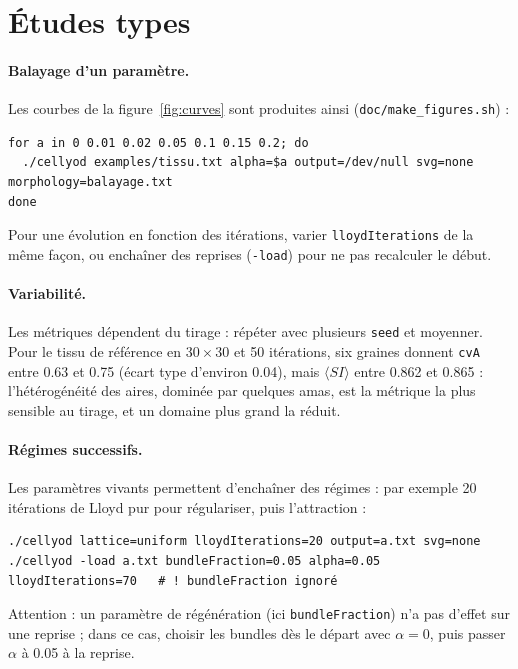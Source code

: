 \documentclass[10pt,a4paper]{article}
\newcommand{\code}[1]{\texttt{#1}}
\begin{document}
\section{Études types}\label{sec:etudes}

\paragraph{Balayage d'un paramètre.} Les courbes de la figure~\ref{fig:curves} sont produites ainsi
(\code{doc/make\_figures.sh}) :
\begin{lstlisting}
for a in 0 0.01 0.02 0.05 0.1 0.15 0.2; do
  ./cellyod examples/tissu.txt alpha=$a output=/dev/null svg=none morphology=balayage.txt
done
\end{lstlisting}
Pour une évolution en fonction des itérations, varier \code{lloydIterations} de la même façon, ou enchaîner des
reprises (\code{-load}) pour ne pas recalculer le début.

\paragraph{Variabilité.} Les métriques dépendent du tirage : répéter avec plusieurs \code{seed} et moyenner.
Pour le tissu de référence en $30\times30$ et 50 itérations, six graines donnent \code{cvA} entre 0.63 et 0.75
(écart type d'environ 0.04), mais $\langle SI\rangle$ entre 0.862 et 0.865 : l'hétérogénéité des aires, dominée par
quelques amas, est la métrique la plus sensible au tirage, et un domaine plus grand la réduit.

\paragraph{Régimes successifs.} Les paramètres vivants permettent d'enchaîner des régimes : par exemple
20 itérations de Lloyd pur pour régulariser, puis l'attraction :
\begin{lstlisting}
./cellyod lattice=uniform lloydIterations=20 output=a.txt svg=none
./cellyod -load a.txt bundleFraction=0.05 alpha=0.05 lloydIterations=70   # ! bundleFraction ignoré
\end{lstlisting}
Attention : un paramètre de régénération (ici \code{bundleFraction}) n'a pas d'effet sur une reprise ; dans ce cas,
choisir les bundles dès le départ avec $\alpha=0$, puis passer $\alpha$ à 0.05 à la reprise.
\end{document}

